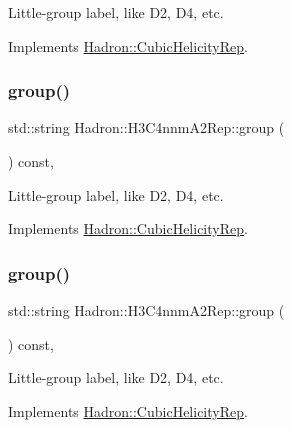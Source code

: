 Little-\/group label, like D2, D4, etc. 

Implements \mbox{\hyperlink{structHadron_1_1CubicHelicityRep_a101a7d76cd8ccdad0f272db44b766113}{Hadron\+::\+Cubic\+Helicity\+Rep}}.

\mbox{\label{structHadron_1_1H3C4nnmA2Rep_a057eae346cf6d906b23501bceef95e9b}} 
\subsubsection{\texorpdfstring{group()}{group()}\hspace{0.1cm}{\footnotesize\ttfamily [3/5]}}
{\footnotesize\ttfamily std\+::string Hadron\+::\+H3\+C4nnm\+A2\+Rep\+::group (\begin{DoxyParamCaption}{ }\end{DoxyParamCaption}) const\hspace{0.3cm}{\ttfamily [inline]}, {\ttfamily [virtual]}}

Little-\/group label, like D2, D4, etc. 

Implements \mbox{\hyperlink{structHadron_1_1CubicHelicityRep_a101a7d76cd8ccdad0f272db44b766113}{Hadron\+::\+Cubic\+Helicity\+Rep}}.

\mbox{\label{structHadron_1_1H3C4nnmA2Rep_a057eae346cf6d906b23501bceef95e9b}} 
\subsubsection{\texorpdfstring{group()}{group()}\hspace{0.1cm}{\footnotesize\ttfamily [4/5]}}
{\footnotesize\ttfamily std\+::string Hadron\+::\+H3\+C4nnm\+A2\+Rep\+::group (\begin{DoxyParamCaption}{ }\end{DoxyParamCaption}) const\hspace{0.3cm}{\ttfamily [inline]}, {\ttfamily [virtual]}}

Little-\/group label, like D2, D4, etc. 

Implements \mbox{\hyperlink{structHadron_1_1CubicHelicityRep_a101a7d76cd8ccdad0f272db44b766113}{Hadron\+::\+Cubic\+Helicity\+Rep}}.

